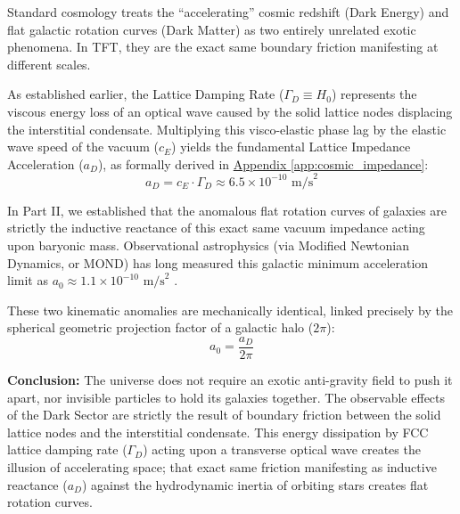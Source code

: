 Standard cosmology treats the ``accelerating'' cosmic redshift (Dark Energy) and flat galactic rotation curves (Dark Matter) as two entirely unrelated exotic phenomena. In TFT, they are the exact same boundary friction manifesting at different scales.

As established earlier, the Lattice Damping Rate ($\Gamma_D \equiv H_0$) represents the viscous energy loss of an optical wave caused by the solid lattice nodes displacing the interstitial condensate. Multiplying this visco-elastic phase lag by the elastic wave speed of the vacuum ($c_E$) yields the fundamental Lattice Impedance Acceleration ($a_D$), as formally derived in \hyperref[app:cosmic_impedance]{Appendix \ref*{app:cosmic_impedance}}:
\begin{equation}
    a_D = c_E \cdot \Gamma_D \approx 6.5 \times 10^{-10} \text{ m/s}^2
\end{equation}

In Part II, we established that the anomalous flat rotation curves of galaxies are strictly the inductive reactance of this exact same vacuum impedance acting upon baryonic mass. Observational astrophysics (via Modified Newtonian Dynamics, or MOND) has long measured this galactic minimum acceleration limit as $a_0 \approx 1.1 \times 10^{-10} \text{ m/s}^2$ \cite{Milgrom_1983}.

These two kinematic anomalies are mechanically identical, linked precisely by the spherical geometric projection factor of a galactic halo ($2\pi$):
\begin{equation}
    a_0 = \frac{a_D}{2\pi}
\end{equation}

\textbf{Conclusion:} The universe does not require an exotic anti-gravity field to push it apart, nor invisible particles to hold its galaxies together. The observable effects of the Dark Sector are strictly the result of boundary friction between the solid lattice nodes and the interstitial condensate. This energy dissipation by FCC lattice damping rate ($\Gamma_D$) acting upon a transverse optical wave creates the illusion of accelerating space; that exact same friction manifesting as inductive reactance ($a_D$) against the hydrodynamic inertia of orbiting stars creates flat rotation curves.